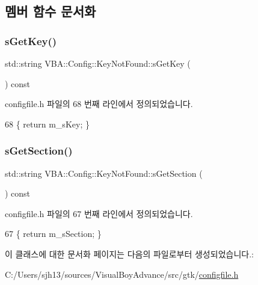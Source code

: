 \subsection{멤버 함수 문서화}
\mbox{\label{class_v_b_a_1_1_config_1_1_key_not_found_af9b10ec83d7e8af942de3abec286bda2}} 
\subsubsection{\texorpdfstring{s\+Get\+Key()}{sGetKey()}}
{\footnotesize\ttfamily std\+::string V\+B\+A\+::\+Config\+::\+Key\+Not\+Found\+::s\+Get\+Key (\begin{DoxyParamCaption}{ }\end{DoxyParamCaption}) const\hspace{0.3cm}{\ttfamily [inline]}}



configfile.\+h 파일의 68 번째 라인에서 정의되었습니다.


\begin{DoxyCode}
68 \{ \textcolor{keywordflow}{return} m\_sKey; \}
\end{DoxyCode}
\mbox{\label{class_v_b_a_1_1_config_1_1_key_not_found_af2eaee8322a1bed64dba70c801335916}} 
\subsubsection{\texorpdfstring{s\+Get\+Section()}{sGetSection()}}
{\footnotesize\ttfamily std\+::string V\+B\+A\+::\+Config\+::\+Key\+Not\+Found\+::s\+Get\+Section (\begin{DoxyParamCaption}{ }\end{DoxyParamCaption}) const\hspace{0.3cm}{\ttfamily [inline]}}



configfile.\+h 파일의 67 번째 라인에서 정의되었습니다.


\begin{DoxyCode}
67 \{ \textcolor{keywordflow}{return} m\_sSection; \}
\end{DoxyCode}


이 클래스에 대한 문서화 페이지는 다음의 파일로부터 생성되었습니다.\+:\begin{DoxyCompactItemize}
\item 
C\+:/\+Users/sjh13/sources/\+Visual\+Boy\+Advance/src/gtk/\mbox{\hyperlink{configfile_8h}{configfile.\+h}}\end{DoxyCompactItemize}
